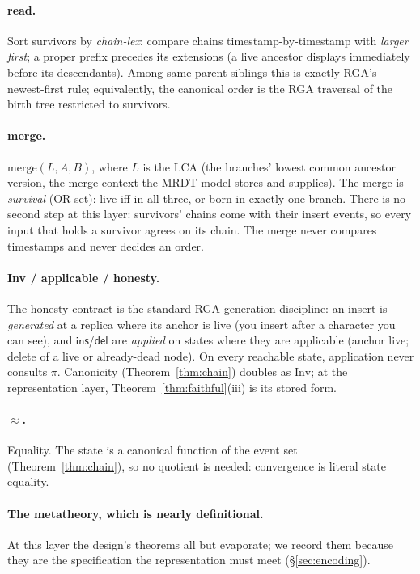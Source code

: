 \documentclass[11pt]{article}
\newcommand{\del}{\mathsf{del}}
\newcommand{\ins}{\mathsf{ins}}
\begin{document}
\paragraph{read.} Sort survivors by \emph{chain-lex}: compare chains
timestamp-by-timestamp with \emph{larger first}; a proper prefix
precedes its extensions (a live ancestor displays immediately before
its descendants). Among same-parent siblings this is exactly RGA's
newest-first rule; equivalently, the canonical order is the RGA
traversal of the birth tree restricted to survivors.

\paragraph{merge.} $\mathrm{merge}(\mathit{L}, A, B)$, where
$\mathit{L}$ is the LCA (the branches' lowest common ancestor
version, the merge context the MRDT model stores and supplies). The
merge is \emph{survival} (OR-set): live iff in all three, or born
in exactly one branch. There is no second step at this layer:
survivors' chains come with their insert events, so every input that
holds a survivor agrees on its chain. The merge never compares
timestamps and never decides an order.

\paragraph{Inv / applicable / honesty.} The honesty contract is the
standard RGA generation discipline: an insert is \emph{generated} at a replica where its
anchor is live (you insert after a character you can see), and
$\ins$/$\del$ are \emph{applied} on states where they are applicable
(anchor live; delete of a live or already-dead node). On every
reachable state, application never consults $\pi$. Canonicity
(Theorem~\ref{thm:chain}) doubles as $\mathrm{Inv}$; at the
representation layer, Theorem~\ref{thm:faithful}(iii) is its stored
form.

\paragraph{$\approx$.} Equality. The state is a canonical function of
the event set (Theorem~\ref{thm:chain}), so no quotient is needed:
convergence is literal state equality.

\paragraph{The metatheory, which is nearly definitional.} At this
layer the design's theorems all but evaporate; we record them because
they are the specification the representation must meet
(\S\ref{sec:encoding}).
\end{document}
